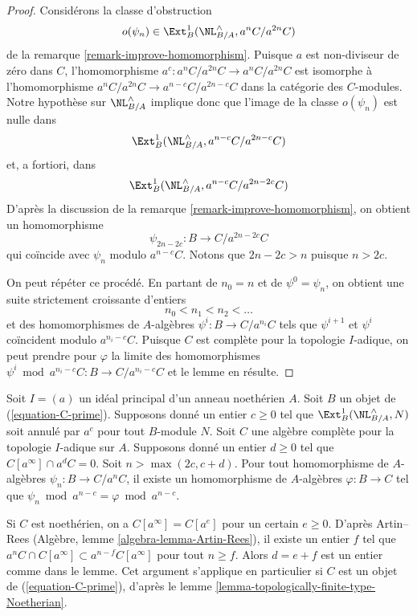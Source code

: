 \begin{proof}
Considérons la classe d'obstruction
$$
o(\psi_n) \in \Ext^1_B(\NL_{B/A}^\wedge, a^nC/a^{2n}C)
$$
de la remarque \ref{remark-improve-homomorphism}. Puisque $a$ est
non-diviseur de zéro dans $C$, l'homomorphisme
$a^c : a^nC/a^{2n}C \to a^nC/a^{2n}C$ est isomorphe à l'homomorphisme
$a^nC/a^{2n}C \to a^{n - c}C/a^{2n - c}C$ dans la catégorie des $C$-modules.
Notre hypothèse sur $\NL_{B/A}^\wedge$ implique donc que l'image de la classe
$o(\psi_n)$ est nulle dans
$$
\Ext^1_B(\NL_{B/A}^\wedge, a^{n - c}C/a^{2n - c}C)
$$
et, a fortiori, dans
$$
\Ext^1_B(\NL_{B/A}^\wedge, a^{n - c}C/a^{2n - 2c}C)
$$
D'après la discussion de la remarque \ref{remark-improve-homomorphism}, on
obtient un homomorphisme
$$
\psi_{2n - 2c} : B \to C/a^{2n - 2c}C
$$
qui coïncide avec $\psi_n$ modulo $a^{n - c}C$. Notons que
$2n - 2c > n$ puisque $n > 2c$.

\medskip\noindent
On peut répéter ce procédé. En partant de $n_0 = n$ et de
$\psi^0 = \psi_n$, on obtient une suite strictement croissante d'entiers
$$
n_0 < n_1 < n_2 < \ldots
$$
et des homomorphismes de $A$-algèbres $\psi^i : B \to C/a^{n_i}C$ tels que
$\psi^{i + 1}$ et $\psi^i$ coïncident modulo $a^{n_i - c}C$. Puisque $C$ est
complète pour la topologie $I$-adique, on peut prendre pour $\varphi$ la
limite des homomorphismes
$\psi^i \bmod a^{n_i - c}C : B \to C/a^{n_i - c}C$
et le lemme en résulte.
\end{proof}

\begin{lemma}
\label{lemma-get-morphism-principal}
Soit $I = (a)$ un idéal principal d'un anneau noethérien $A$. Soit $B$ un
objet de (\ref{equation-C-prime}). Supposons donné un entier $c \geq 0$ tel
que $\Ext^1_B(\NL_{B/A}^\wedge, N)$ soit annulé par $a^c$ pour tout
$B$-module $N$. Soit $C$ une algèbre complète pour la topologie $I$-adique
sur $A$. Supposons donné un entier $d \geq 0$ tel que
$C[a^\infty] \cap a^dC = 0$. Soit $n > \max(2c, c + d)$. Pour tout
homomorphisme de $A$-algèbres $\psi_n : B \to C/a^nC$, il existe un
homomorphisme de $A$-algèbres $\varphi : B \to C$ tel que
$\psi_n \bmod a^{n - c} = \varphi \bmod a^{n - c}$.
\end{lemma}

\noindent
Si $C$ est noethérien, on a $C[a^\infty] = C[a^e]$ pour un certain
$e \geq 0$. D'après Artin--Rees (Algèbre, lemme
\ref{algebra-lemma-Artin-Rees}), il existe un entier $f$ tel que
$a^nC \cap C[a^\infty] \subset a^{n - f}C[a^\infty]$ pour tout $n \geq f$.
Alors $d = e + f$ est un entier comme dans le lemme. Cet argument s'applique
en particulier si $C$ est un objet de (\ref{equation-C-prime}), d'après le
lemme \ref{lemma-topologically-finite-type-Noetherian}.

